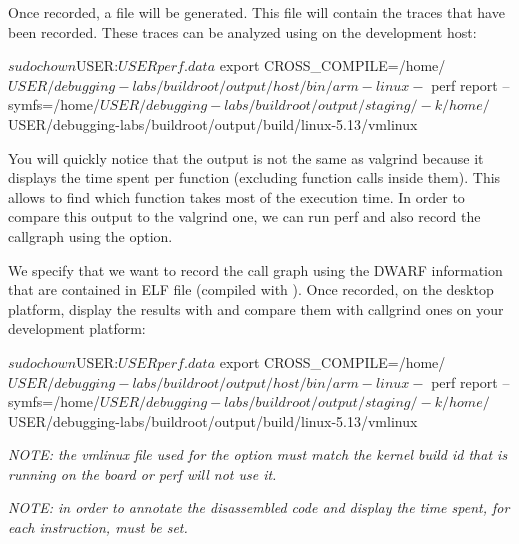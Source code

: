 Once recorded, a  file will be generated. This file will
contain the traces that have been recorded. These traces can be analyzed using
 on the development host:

\begin{bashinput}
$ sudo chown $USER:$USER perf.data
$ export CROSS_COMPILE=/home/$USER/debugging-labs/buildroot/output/host/bin/arm-linux-
$ perf report --symfs=/home/$USER/debugging-labs/buildroot/output/staging/
    -k /home/$USER/debugging-labs/buildroot/output/build/linux-5.13/vmlinux
\end{bashinput}

You will quickly notice that the output is not the same as valgrind because it
displays the time spent per function (excluding function calls inside them).
This allows to find which function takes most of the execution time. In order to
compare this output to the valgrind one, we can run perf and also record the
callgraph using the  option.


We specify that we want to record the call graph using the DWARF information
that are contained in ELF file (compiled with ). Once recorded, on the
desktop platform, display the results with  and compare them
with callgrind ones on your development platform:

\begin{bashinput}
$ sudo chown $USER:$USER perf.data
$ export CROSS_COMPILE=/home/$USER/debugging-labs/buildroot/output/host/bin/arm-linux-
$ perf report --symfs=/home/$USER/debugging-labs/buildroot/output/staging/
   -k /home/$USER/debugging-labs/buildroot/output/build/linux-5.13/vmlinux
\end{bashinput}

{\em NOTE: the vmlinux file used for the  option must match the kernel
build id that is running on the board or perf will not use it.}

{\em NOTE: in order to annotate the disassembled code and display the time spent,
for each instruction,  must be set.}
